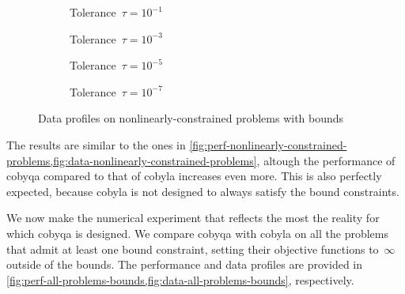 \begin{figure}[ht]
    \centering
    \begin{subfigure}[b]{0.49\textwidth}
        \centering
        \caption{Tolerance~$\tau = 10^{-1}$}
    \end{subfigure}
    \hfill
    \begin{subfigure}[b]{0.49\textwidth}
        \centering
        \caption{Tolerance~$\tau = 10^{-3}$}
    \end{subfigure}
    \begin{subfigure}[b]{0.49\textwidth}
        \centering
        \caption{Tolerance~$\tau = 10^{-5}$}
    \end{subfigure}
    \hfill
    \begin{subfigure}[b]{0.49\textwidth}
        \centering
        \caption{Tolerance~$\tau = 10^{-7}$}
    \end{subfigure}
    \caption{Data profiles on nonlinearly-constrained problems with bounds}
    \label{fig:data-nonlinearly-constrained-problems-bounds}
\end{figure}

The results are similar to the ones in \cref{fig:perf-nonlinearly-constrained-problems,fig:data-nonlinearly-constrained-problems}, altough the performance of \gls{cobyqa} compared to that of \gls{cobyla} increases even more.
This is also perfectly expected, because \gls{cobyla} is not designed to always satisfy the bound constraints.

We now make the numerical experiment that reflects the most the reality for which \gls{cobyqa} is designed.
We compare \gls{cobyqa} with \gls{cobyla} on all the problems that admit at least one bound constraint, setting their objective functions to~$\infty$ outside of the bounds.
The performance and data profiles are provided in \cref{fig:perf-all-problems-bounds,fig:data-all-problems-bounds}, respectively.

